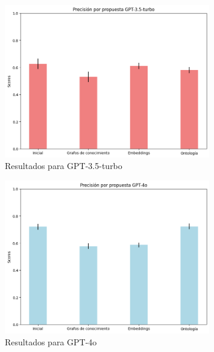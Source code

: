 \begin{figure}[H]
    \centering
    \includegraphics[width=0.8\textwidth]{images/Resultados_gpt35.png}
    \caption{Resultados para GPT-3.5-turbo}
    \label{fig:resultados_gpt35}
\end{figure}

\begin{figure}[H]
    \centering
    \includegraphics[width=0.8\textwidth]{images/Resultados_gpt4o.png}
    \caption{Resultados para GPT-4o}
    \label{fig:resultados_gpt4o}
\end{figure}